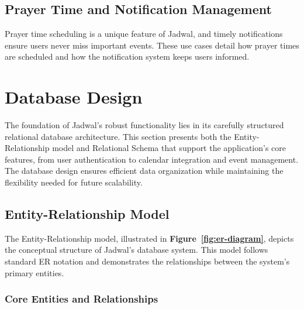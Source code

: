 \subsection{Prayer Time and Notification Management}
Prayer time scheduling is a unique feature of Jadwal, and timely notifications ensure users never miss important events. These use cases detail how prayer times are scheduled and how the notification system keeps users informed.









\section{Database Design}

The foundation of Jadwal's robust functionality lies in its carefully structured relational database architecture. This section presents both the Entity-Relationship model and Relational Schema that support the application's core features, from user authentication to calendar integration and event management. The database design ensures efficient data organization while maintaining the flexibility needed for future scalability.

\subsection{Entity-Relationship Model}

The Entity-Relationship model, illustrated in \textbf{Figure~\ref{fig:er-diagram}}, depicts the conceptual structure of Jadwal's database system. This model follows standard ER notation and demonstrates the relationships between the system's primary entities.

\subsubsection{Core Entities and Relationships}

